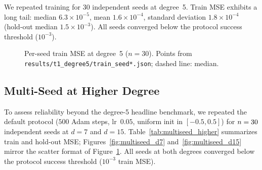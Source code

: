 \documentclass[11pt,a4paper]{article}
\begin{document}
We repeated training for 30 independent seeds at degree~5. Train MSE exhibits a long tail: median $6.3\times10^{-5}$, mean $1.6\times10^{-4}$, standard deviation $1.8\times10^{-4}$ (hold-out median $1.5\times10^{-3}$). All seeds converged below the protocol success threshold ($10^{-3}$).

\begin{figure}[ht]
\centering
{}
\caption{Per-seed train MSE at degree~5 ($n=30$). Points from \texttt{results/t1\_degree5/train\_seed*.json}; dashed line: median.}
\label{fig:multiseed}
\end{figure}

\subsection{Multi-Seed at Higher Degree}
\label{sec:multiseed_higher}

To assess reliability beyond the degree-5 headline benchmark, we repeated the default protocol ($500$ Adam steps, lr~$0.05$, uniform init in $[-0.5,0.5]$) for $n=30$ independent seeds at $d=7$ and $d=15$. Table~\ref{tab:multiseed_higher} summarizes train and hold-out MSE; Figures~\ref{fig:multiseed_d7} and~\ref{fig:multiseed_d15} mirror the scatter format of Figure~\ref{fig:multiseed}. All seeds at both degrees converged below the protocol success threshold ($10^{-3}$ train MSE).
\end{document}
